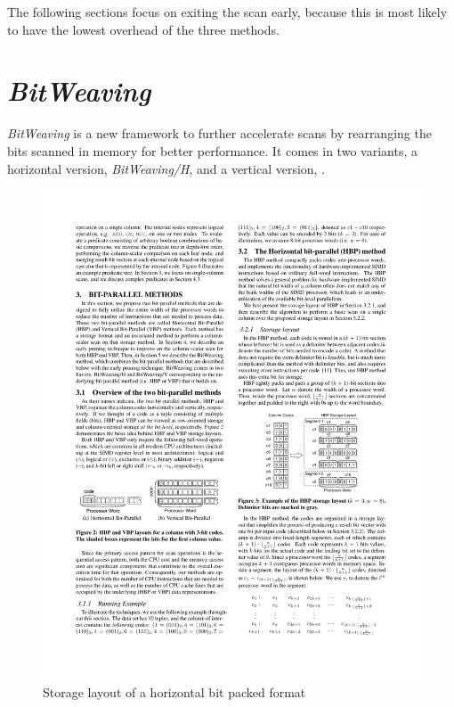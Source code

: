 The following sections focus on exiting the scan early, because this is most
likely to have the lowest overhead of the three methods.

\section{\emph{BitWeaving}}

\emph{BitWeaving} \cite{BitWeaving} is a new framework to further accelerate
scans by rearranging the bits scanned in memory for better performance. It comes
in two variants, a horizontal version, \emph{BitWeaving/H}, and a vertical
version, \bwv{}.

\begin{figure}[h] \begin{center}
\includegraphics[scale=1.5]{images/bwh}
\end{center}
\caption{Storage layout of a horizontal bit packed format~\cite{BitWeaving}}
\label{fig:bwh}
\end{figure}

